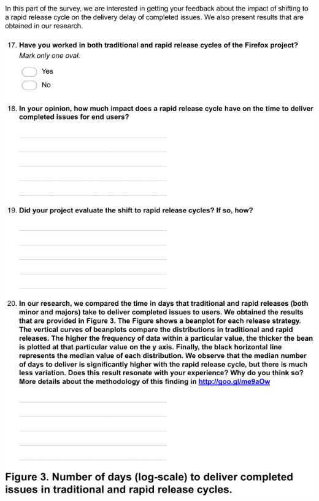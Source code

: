 \documentclass[
	12pt,				%
	openright,			%
	oneside,			%
	a4paper,			%
	french,				%
	spanish,			%
	brazil,				%
	english
	]{abntex2}
\newcounter{pt}
\newcounter{th}
\begin{document}
\begin{apendicesenv}
\includegraphics[width=.8\textwidth,keepaspectratio]{chapters/chapter5/appendix/Firefox6.pdf}


\end{apendicesenv}
\end{document}
